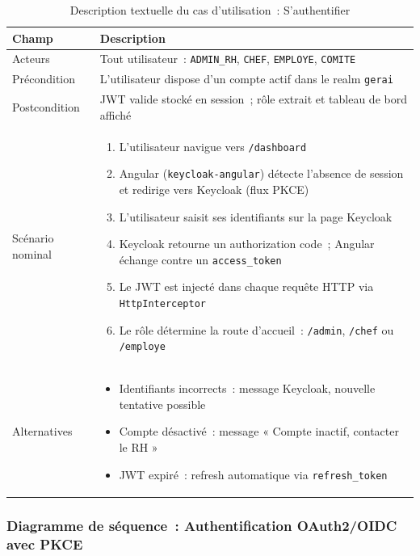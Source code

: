 \begin{table}[H]
\centering
\caption{Description textuelle du cas d'utilisation~: S'authentifier}
\label{tab:uc_auth_desc}
\begin{tabularx}{\textwidth}{|l|L|}
\hline
{}\textbf{Champ} & \textbf{Description} \\\hline
{}
Acteurs & Tout utilisateur~: \texttt{ADMIN\_RH}, \texttt{CHEF}, \texttt{EMPLOYE}, \texttt{COMITE} \\\hline
Précondition & L'utilisateur dispose d'un compte actif dans le realm \texttt{gerai} \\\hline
{}
Postcondition & JWT valide stocké en session~; rôle extrait et tableau de bord affiché \\\hline
Scénario nominal &
\begin{enumerate}[leftmargin=*,nosep]
  \item L'utilisateur navigue vers \texttt{/dashboard}
  \item Angular (\texttt{keycloak-angular}) détecte l'absence de session et redirige vers Keycloak (flux PKCE)
  \item L'utilisateur saisit ses identifiants sur la page Keycloak
  \item Keycloak retourne un authorization code~; Angular échange contre un \texttt{access\_token}
  \item Le JWT est injecté dans chaque requête HTTP via \texttt{HttpInterceptor}
  \item Le rôle détermine la route d'accueil~: \texttt{/admin}, \texttt{/chef} ou \texttt{/employe}
\end{enumerate} \\\hline
{}
Alternatives &
\begin{itemize}[leftmargin=*,nosep]
  \item Identifiants incorrects~: message Keycloak, nouvelle tentative possible
  \item Compte désactivé~: message « Compte inactif, contacter le RH »
  \item JWT expiré~: refresh automatique via \texttt{refresh\_token}
\end{itemize} \\\hline
\end{tabularx}
\end{table}

\subsubsection*{Diagramme de séquence~: Authentification OAuth2/OIDC avec PKCE}

